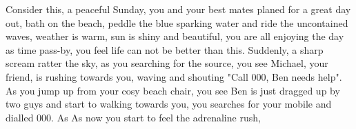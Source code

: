 Consider this, a peaceful Sunday, you and your best mates planed for a great day out, bath on the beach, peddle the blue sparking water and ride the uncontained waves, weather is warm, sun is shiny and beautiful, you are all enjoying the day as time pass-by, you feel life can not be better than this. Suddenly, a sharp scream ratter the sky, as you searching for the source, you see Michael, your friend, is rushing towards you, waving and shouting "Call 000, Ben needs help". As you jump up from your cosy beach chair, you see Ben is just dragged up by two guys and start to walking towards you, you searches for your mobile and dialled 000. As As now you start to feel the adrenaline rush,  